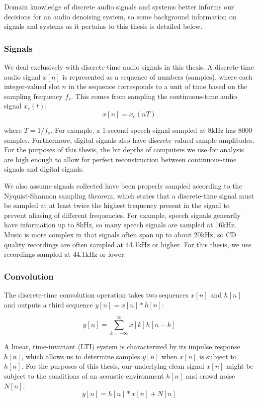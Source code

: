 Domain knowledge of discrete audio signals and systems better informs our decisions for an audio denoising system, so some background information on signals and systems as it pertains to this thesis is detailed below.

\subsubsection{Signals}
We deal exclusively with discrete-time audio signals in this thesis. A discrete-time audio signal $x[n]$ is represented as a sequence of numbers (samples), where each integer-valued slot $n$ in the sequence corresponds to a unit of time based on the sampling frequency $f_s$. This comes from sampling the continuous-time audio signal $x_c(t)$:
\begin{equation}
x[n] = x_c(nT)
\end{equation}

where $T=1/f_s$.
For example, a 1-second speech signal sampled at 8kHz has 8000 samples. Furthermore, digital signals also have discrete valued sample amplitudes. For the purposes of this thesis, the bit depths of computers we use for analysis are high enough to allow for perfect reconstruction between continuous-time signals and digital signals.

We also assume signals collected have been properly sampled according to the Nyquist-Shannon sampling theorem, which states that a discrete-time signal must be sampled at at least twice the highest frequency present in the signal to prevent aliasing of different frequencies. For example, speech signals genearlly have information up to 8kHz, so many speech signals are sampled at 16kHz. Music is more complex in that signals often span up to about 20kHz, so CD quality recordings are often sampled at 44.1kHz or higher. For this thesis, we use recordings sampled at 44.1kHz or lower.


\subsubsection{Convolution}
The discrete-time convolution operation takes two sequences $x[n]$ and $h[n]$ and outputs a third sequence $y[n] = x[n] * h[n]$:

\begin{equation}
y[n] = \sum_{k=-\infty}^{\infty} x[k]h[n-k]
\end{equation}

A linear, time-invariant (LTI) system is characterized by its impulse response $h[n]$, which allows us to determine samples $y[n]$ when $x[n]$ is subject to $h[n]$. For the purposes of this thesis, our underlying clean signal $x[n]$ might be subject to the conditions of an acoustic environment $h[n]$ and crowd noise $N[n]$:
\begin{equation}
y[n] = h[n]*x[n]+N[n]
\end{equation}

